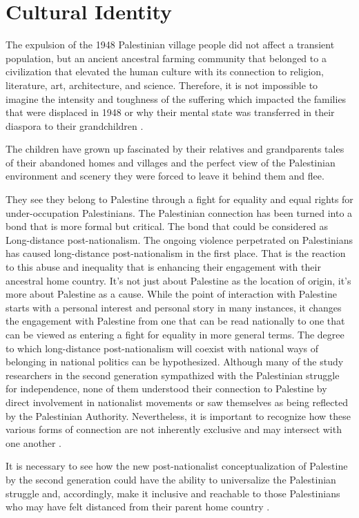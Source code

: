 \section{Cultural Identity}
 
The expulsion of the 1948 Palestinian village people did not affect a transient population, but an ancient ancestral farming community that belonged to a civilization that elevated the human culture with its connection to religion, literature, art, architecture, and science. Therefore, it is not impossible to imagine the intensity and toughness of the suffering which impacted the families that were displaced in 1948 or why their mental state was transferred in their diaspora to their grandchildren \citep{Khalidi2015}.
 
 The children have grown up fascinated by their relatives and grandparents tales of their abandoned homes and villages and the perfect view of the Palestinian environment and scenery they were forced to leave it behind them and flee.

They see they belong to Palestine through a fight for equality and equal rights for under-occupation Palestinians. The Palestinian connection has been turned into a bond that is more formal but critical. The bond that could be considered as Long-distance post-nationalism. The ongoing violence perpetrated on Palestinians has caused long-distance post-nationalism in the first place. That is the reaction to this abuse and inequality that is enhancing their engagement with their ancestral home country. It's not just about Palestine as the location of origin, it's more about Palestine as a cause. While the point of interaction with Palestine starts with a personal interest and personal story in many instances, it changes the engagement with Palestine from one that can be read nationally to one that can be viewed as entering a fight for equality in more general terms.
The degree to which long-distance post-nationalism will coexist with national ways of belonging in national politics can be hypothesized. Although many of the study researchers in the second generation sympathized with the Palestinian struggle for independence, none of them understood their connection to Palestine by direct involvement in nationalist movements or saw themselves as being reflected by the Palestinian Authority. Nevertheless, it is important to recognize how these various forms of connection are not inherently exclusive and may intersect with one another \citep{Blachnicka-Ciacek2018}.

It is necessary to see how the new post-nationalist conceptualization of Palestine by the second generation could have the ability to universalize the Palestinian struggle and, accordingly, make it inclusive and reachable to those Palestinians who may have felt distanced from their parent home country \citep{Blachnicka-Ciacek2018}. 

